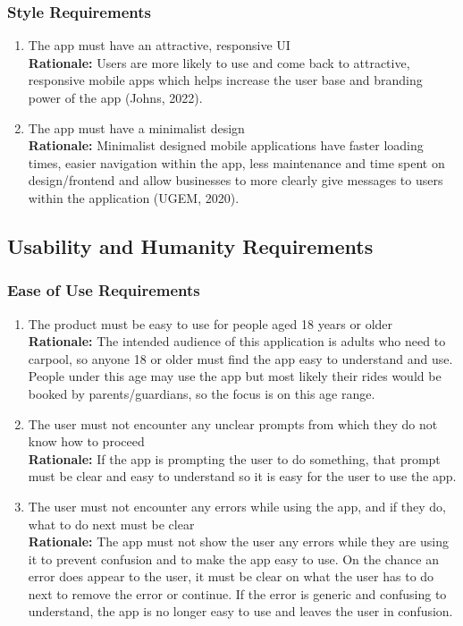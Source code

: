 \documentclass[]{article}
\begin{document}
\subsubsection{Style Requirements}
\label{ssub:style_requirements}
\begin{enumerate}[{LF-S}1. ]
	\item The app must have an attractive, responsive UI \\
	{\bf Rationale:} Users are more likely to use and come back to attractive, responsive mobile apps which helps increase the user base and branding power of the app (Johns, 2022). 
	\item The app must have a minimalist design \\
	{\bf Rationale:} Minimalist designed mobile applications have faster loading times, easier navigation within the app, less maintenance and time spent on design/frontend and allow businesses to more clearly give messages to users within the application (UGEM, 2020).
\end{enumerate}


\subsection{Usability and Humanity Requirements}
\label{sub:usability_and_humanity_requirements}

\subsubsection{Ease of Use Requirements}
\label{ssub:ease_of_use_requirements}
\begin{enumerate}[{UH-EOU}1. ]
	\item The product must be easy to use for people aged 18 years or older \\
	{\bf Rationale:} The intended audience of this application is adults who need to carpool, so anyone 18 or older must find the app easy to understand and use. People under this age may use the app but most likely their rides would be booked by parents/guardians, so the focus is on this age range.
	\item The user must not encounter any unclear prompts from which they do not know how to proceed \\
	{\bf Rationale:} If the app is prompting the user to do something, that prompt must be clear and easy to understand so it is easy for the user to use the app.
	\item The user must not encounter any errors while using the app, and if they do, what to do next must be clear \\
	{\bf Rationale:} The app must not show the user any errors while they are using it to prevent confusion and to make the app easy to use. On the chance an error does appear to the user, it must be clear on what the user has to do next to remove the error or continue. If the error is generic and confusing to understand, the app is no longer easy to use and leaves the user in confusion.
\end{enumerate}
\end{document}
